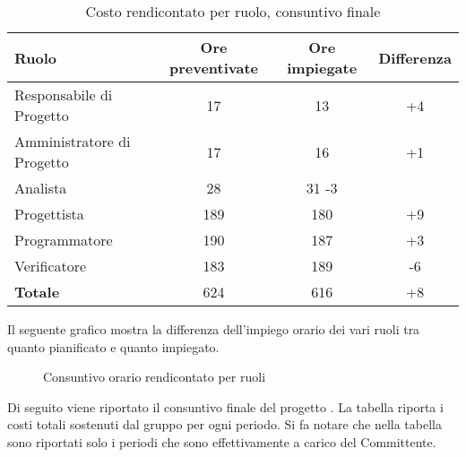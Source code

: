 \begin{table}[h]
	\centering
	\begin{tabular}{|l|c|c|c|}
		\toprule
		\textbf{Ruolo} & \textbf{Ore preventivate} & \textbf{Ore impiegate} & \textbf{Differenza} \\
		
		\midrule
		Responsabile di Progetto & 17 & 13 & +4 \\
		Amministratore di Progetto & 17 & 16 & +1 \\ 
		Analista & 28 & 31 -3 & \\
		Progettista & 189 & 180 & +9 \\
		Programmatore & 190 & 187 & +3 \\
		Verificatore & 183 & 189 & -6 \\
		\midrule
		\textbf{Totale} & 624 & 616 & +8 \\
		
		\bottomrule
	\end{tabular}
	\caption{Costo rendicontato per ruolo, consuntivo finale}
\end{table}

\newpage
\noindent Il seguente grafico mostra la differenza dell'impiego orario dei vari ruoli tra quanto pianificato e quanto impiegato.

\begin{figure}[h]
	\centering
	\caption{Consuntivo orario rendicontato per ruoli}
\end{figure}

\noindent Di seguito viene riportato il consuntivo finale del progetto \PROGETTO{}. La tabella riporta i costi totali sostenuti dal gruppo per ogni periodo. Si fa notare che nella tabella sono riportati solo i periodi che sono effettivamente a carico del Committente.

